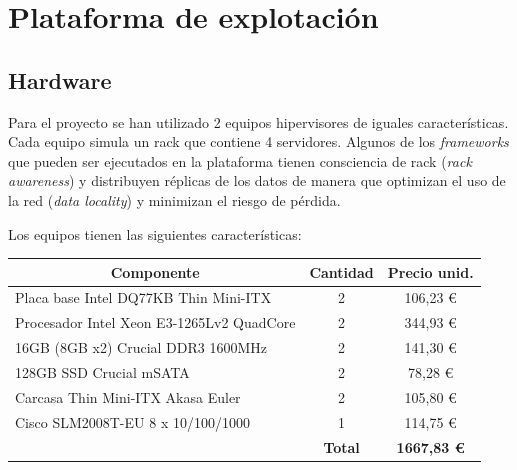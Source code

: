 \documentclass[a4paper,12pt,spanish,final]{epsc_tfc_pfc}
\begin{document}
\pagestyle{fancy}


\chapter{Plataforma de explotación}
\section{Hardware}
Para el proyecto se han utilizado 2 equipos hipervisores de iguales características. Cada equipo simula un rack que contiene 4 servidores. Algunos de los \emph{frameworks} que pueden ser ejecutados en la plataforma tienen consciencia de rack (\emph{rack awareness}) y distribuyen réplicas de los datos de manera que optimizan el uso de la red (\emph{data locality}) y minimizan el riesgo de pérdida.

Los equipos tienen las siguientes características:

\begin{table}[h]
  \centering
  \begin{tabular}{l|c|c|}
    \hline
    \multicolumn{1}{|c|}{\textbf{Componente}}                       & \textbf{Cantidad} & \textbf{Precio unid.}  \\ \hline
    \multicolumn{1}{|l|}{Placa base Intel DQ77KB Thin Mini-ITX}     & 2                 & 106,23 \euro           \\ \hline
    \multicolumn{1}{|l|}{Procesador Intel Xeon E3-1265Lv2 QuadCore} & 2                 & 344,93 \euro           \\ \hline
    \multicolumn{1}{|l|}{16GB (8GB x2) Crucial DDR3 1600MHz}        & 2                 & 141,30 \euro           \\ \hline
    \multicolumn{1}{|l|}{128GB SSD Crucial mSATA}                   & 2                 & 78,28 \euro            \\ \hline
    \multicolumn{1}{|l|}{Carcasa Thin Mini-ITX Akasa Euler}         & 2                 & 105,80 \euro           \\ \hline
    \multicolumn{1}{|l|}{Cisco SLM2008T-EU 8 x 10/100/1000}         & 1                 & 114,75 \euro           \\ \hline
                                                                    & \textbf{Total}    & \textbf{1667,83 \euro} \\ \cline{2-3}
  \end{tabular}
\end{table}
\end{document}
